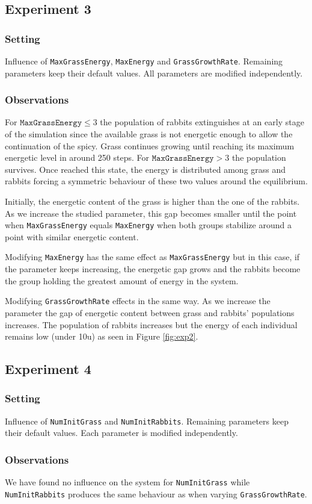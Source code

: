 \documentclass[11pt]{article}
\begin{document}
\subsection{Experiment 3}
\subsubsection{Setting}

Influence of \texttt{MaxGrassEnergy}, \texttt{MaxEnergy} and \texttt{GrassGrowthRate}. Remaining parameters keep their default values. All parameters are modified independently. 

\subsubsection{Observations}

For $\texttt{MaxGrassEnergy} \leq 3$ the population of rabbits extinguishes at an early stage of the simulation since the available grass is not energetic enough to allow the continuation of the spicy. Grass continues growing until reaching its maximum energetic level in around 250 steps. For $\texttt{MaxGrassEnergy} > 3$ the population survives. Once reached this state, the energy is distributed among grass and rabbits forcing a symmetric behaviour of these two values around the equilibrium.

Initially, the energetic content of the grass is higher than the one of the rabbits. As we increase the studied parameter, this gap becomes smaller until the point when \texttt{MaxGrassEnergy} equals \texttt{MaxEnergy} when both groups stabilize around a point with similar energetic content.

Modifying \texttt{MaxEnergy} has the same effect as \texttt{MaxGrassEnergy} but in this case, if the parameter keeps increasing, the energetic gap grows and the rabbits become the group holding the greatest amount of energy in the system. 

Modifying \texttt{GrassGrowthRate} effects in the same way. As we increase the parameter the gap of energetic content between grass and rabbits' populations increases. The population of rabbits increases but the energy of each individual remains low (under 10u) as seen in Figure \ref{fig:exp2}.



\subsection{Experiment 4} 
\subsubsection{Setting}
Influence of \texttt{NumInitGrass} and \texttt{NumInitRabbits}. Remaining parameters keep their default values. Each parameter is modified independently. 
\subsubsection{Observations}
We have found no influence on the system for \texttt{NumInitGrass} while \texttt{NumInitRabbits} produces the same behaviour as when varying \texttt{GrassGrowthRate}. 
\end{document}
